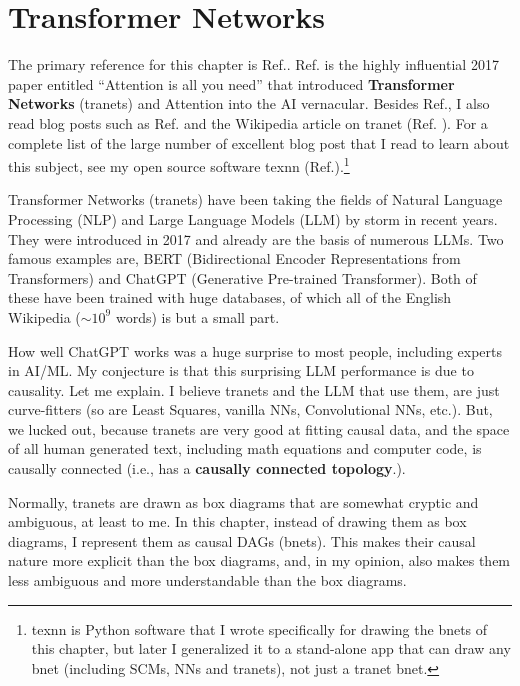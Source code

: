 \chapter{Transformer Networks}
\label{ch-transformer}

The primary reference for this chapter is  Ref.\cite{attention-is-all-you-need}.
Ref.\cite{attention-is-all-you-need} is  
 the highly influential  2017 paper entitled
\enquote{Attention is all you need}
that introduced {\bf Transformer Networks} (tranets) and 
Attention into the AI vernacular.
Besides Ref.\cite{attention-is-all-you-need},
I also read blog posts
such as Ref.\cite{joshi-trans}
and the Wikipedia article on  tranet (Ref. \cite{wiki-transformer}).
For a complete list of the large number
of excellent blog post that I read to learn
about this subject, see my open source software texnn
(Ref.\cite{texnn}).\footnote{
texnn is
 Python software 
 that I wrote
specifically for drawing the bnets
of this chapter, but later I 
generalized it to a stand-alone app that can draw
any bnet (including SCMs, NNs and tranets), not just a tranet bnet.}

Transformer Networks (tranets)
have been taking the fields of
Natural Language Processing (NLP)
and Large Language Models (LLM)
by storm in recent years.
They were introduced in 2017 and already
are the basis of numerous LLMs.
Two famous examples are,
BERT (Bidirectional Encoder
Representations from Transformers)
and ChatGPT (Generative Pre-trained Transformer).
Both of these
have been trained with
huge databases,
of which all of
the English Wikipedia ($\sim 10^9$ words)
is but a small part.

How well ChatGPT works was a huge
surprise to most people, including experts in AI/ML.
My conjecture is that this surprising
LLM performance is
 due to causality.
 Let me explain. I believe tranets and the LLM that use them, are just curve-fitters (so are Least Squares, vanilla NNs, Convolutional NNs, etc.). But, we lucked out, because
tranets are very good at fitting causal data, and the space of all human generated text, including math
equations and computer code,
is causally connected (i.e., has
a {\bf causally connected topology}.).

Normally, tranets are
drawn as box diagrams
that are somewhat cryptic and ambiguous, at least to me.
In this chapter,
instead of 
drawing them as box diagrams,
I represent them as causal DAGs (bnets). This makes their
causal nature more explicit than 
the box diagrams, and,
in my opinion, also makes them
less ambiguous  and more understandable than the box diagrams.




